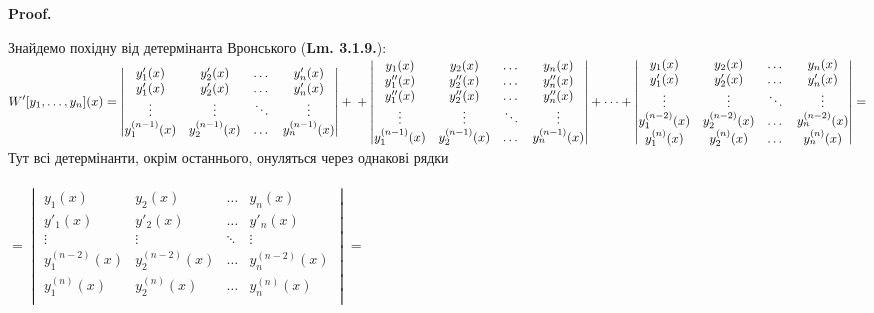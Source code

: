 \documentclass[a4paper, 10pt]{article}
\makeatletter
\def\qed{$\blacksquare$}
\theoremstyle{theoremdd}
\theoremstyle{theoremdd}
\theoremstyle{theoremdd}
\theoremstyle{theoremdd}
\theoremstyle{theoremdd}
\theoremstyle{theoremdd}
\theoremstyle{theoremdd}
\theoremstyle{theoremdd}
\renewenvironment{proof}[1][Proof.\\]{\par
\pushQED{\hfill \qed}%
\normalfont \topsep6\p@\@plus6\p@\relax
\trivlist
\item\relax
{\bfseries
#1\@addpunct{.}}\hspace\labelsep\ignorespaces
}{%
\popQED\endtrivlist\@endpefalse
}
\makeatother
\begin{document}
\begin{proof}
Знайдемо похідну від детермінанта Вронського (\textbf{Lm. 3.1.9.}):\\
$\displaystyle W'[y_1, \dots, y_n](x) = 
\begin{vmatrix} 
	y'_1(x) &  y'_2(x) & \dots & y'_n(x) \\ 
	y'_1(x) &  y'_2(x) & \dots & y'_n(x) \\
	\vdots &  \vdots & \ddots & \vdots \\
	y^{(n-1)}_1(x) &  y^{(n-1)}_2(x) & \dots & y^{(n-1)}_n(x) \\ 
\end{vmatrix}
+ \\ +
\begin{vmatrix} 
	y_1(x) &  y_2(x) & \dots & y_n(x) \\ 
	y''_1(x) &  y''_2(x) & \dots & y''_n(x) \\
	y''_1(x) &  y''_2(x) & \dots & y''_n(x) \\
	\vdots &  \vdots & \ddots & \vdots \\
	y^{(n-1)}_1(x) &  y^{(n-1)}_2(x) & \dots & y^{(n-1)}_n(x) \\ 
\end{vmatrix}
+ \dots +
\begin{vmatrix} 
	y_1(x) &  y_2(x) & \dots & y_n(x) \\ 
	y'_1(x) &  y'_2(x) & \dots & y'_n(x) \\
	\vdots &  \vdots & \ddots & \vdots \\
	y^{(n-2)}_1(x) &  y^{(n-2)}_2(x) & \dots & y^{(n-2)}_n(x) \\ 
	y^{(n)}_1(x) &  y^{(n)}_2(x) & \dots & y^{(n)}_n(x) \\ 
\end{vmatrix} =
$\\
Тут всі детермінанти, окрім останнього, онуляться через однакові рядки\\
\\
$\displaystyle = \begin{vmatrix} 
	y_1(x) &  y_2(x) & \dots & y_n(x) \\ 
	y'_1(x) &  y'_2(x) & \dots & y'_n(x) \\
	\vdots &  \vdots & \ddots & \vdots \\
	y^{(n-2)}_1(x) &  y^{(n-2)}_2(x) & \dots & y^{(n-2)}_n(x) \\ 
	y^{(n)}_1(x) &  y^{(n)}_2(x) & \dots & y^{(n)}_n(x) \\ 
\end{vmatrix} \boxed{=}$\\

\end{proof}
\end{document}
